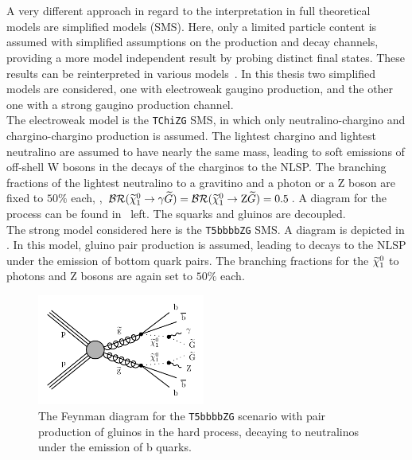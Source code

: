 \\\\A very different approach in regard to the interpretation in full theoretical models are simplified models (SMS)\cite{SMS}. Here, only a limited particle content is assumed with simplified assumptions on the production and decay channels, providing a more model independent result by probing distinct final states. These results can be reinterpreted in various models~\cite{SMSReInt}. In this thesis two simplified models are considered, one with electroweak gaugino production, and the other one with a strong gaugino production channel.\\
The electroweak model is the \texttt{TChiZG} SMS, in which only neutralino-chargino and chargino-chargino production is assumed. The lightest chargino and lightest neutralino are assumed to have nearly the same mass, leading to soft emissions of off-shell W bosons in the decays of the charginos to the NLSP. The branching fractions of the lightest neutralino to a gravitino and a photon or a Z boson are fixed to $50\%$ each, \ie, $\mathcal{BR}(\widetilde{\chi}^{0}_{1}\to\gamma\widetilde{G})=\mathcal{BR}(\widetilde{\chi}^{0}_{1}\to\mathrm{Z}\widetilde{G})=0.5$. A diagram for the process can be found in~ left. The squarks and gluinos are decoupled.\\
The strong model considered here is the \texttt{T5bbbbZG} SMS. A diagram is depicted in . In this model, gluino pair production is assumed, leading to decays to the NLSP under the emission of bottom quark pairs. The branching fractions for the $\widetilde{\chi}^{0}_{1}$ to photons and Z bosons are again set to $50\%$ each.

\begin{figure}[tbp]
 \centering
 \includegraphics[width=0.49\textwidth]{figures/signal/T5bbbbZG-crop}
 \caption{The Feynman diagram for the \texttt{T5bbbbZG} scenario with pair production of gluinos in the hard process, decaying to neutralinos under the emission of b quarks.}
 \label{fig:strongSMS}
\end{figure}


